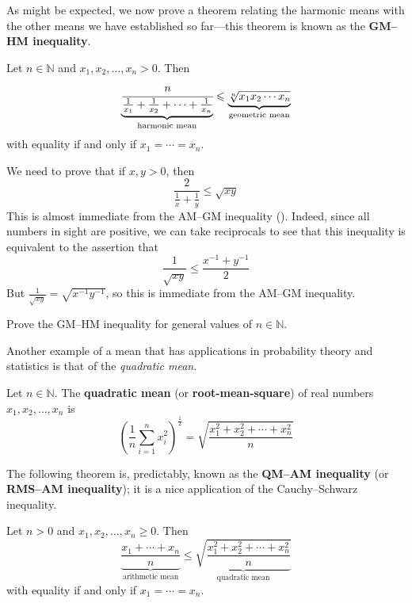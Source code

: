 As might be expected, we now prove a theorem relating the harmonic means with the other means we have established so far---this theorem is known as the \textbf{GM--HM inequality}.

\begin{theorem}
\label{thmGMHMInequality}
Let $n \in \mathbb{N}$ and $x_1,x_2,\dots,x_n > 0$. Then
\[ \underbrace{\cfrac{n}{\frac{1}{x_1} + \frac{1}{x_2} + \cdots + \frac{1}{x_n}}}_{\text{harmonic mean}} \le \underbrace{\sqrt[n]{x_1x_2 \cdots x_n}}_{\text{geometric mean}} \]
with equality if and only if $x_1 = \cdots = x_n$.
\end{theorem}
\begin{cproof}[when $n=2$]
We need to prove that if $x,y > 0$, then
\[ \frac{2}{\frac{1}{x} + \frac{1}{y}} \le \sqrt{xy} \]
This is almost immediate from the AM--GM inequality (). Indeed, since all numbers in sight are positive, we can take reciprocals to see that this inequality is equivalent to the assertion that
\[ \frac{1}{\sqrt{xy}} \le \frac{x^{-1} + y^{-1}}{2} \]
But $\frac{1}{\sqrt{xy}} = \sqrt{x^{-1}y^{-1}}$, so this is immediate from the AM--GM inequality.
\end{cproof}

\begin{exercise}
Prove the GM--HM inequality for general values of $n \in \mathbb{N}$.
\end{exercise}

Another example of a mean that has applications in probability theory and statistics is that of the \textit{quadratic mean}.

\begin{definition}
\label{defQuadraticMean}
Let $n \in \mathbb{N}$. The \textbf{quadratic mean} (or \textbf{root-mean-square}) of real numbers $x_1,x_2,\dots,x_n$ is
\[ \left( \frac{1}{n} \sum_{i=1}^n x_i^2 \right)^{\frac{1}{2}} = \sqrt{\frac{x_1^2+x_2^2+\cdots+x_n^2}{n}} \]
\end{definition}

The following theorem is, predictably, known as the \textbf{QM--AM inequality} (or \textbf{RMS--AM inequality}); it is a nice application of the Cauchy--Schwarz inequality.

\begin{theorem}
\label{thmQMAMInequality}
Let $n > 0$ and $x_1,x_2,\dots,x_n \ge 0$. Then
\[ \underbrace{\frac{x_1 + \cdots + x_n}{n}}_{\text{arithmetic mean}} \le \underbrace{\sqrt{\frac{x_1^2+x_2^2+\cdots+x_n^2}{n}}}_{\text{quadratic mean}} \]
with equality if and only if $x_1 = \cdots = x_n$.
\end{theorem}

